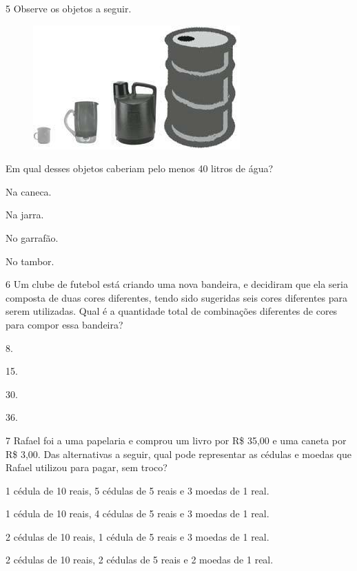 \num{5} Observe os objetos a seguir.

\begin{figure}[htpb!]
\centering
\includegraphics[width=\textwidth]{media/image87.jpg}
\end{figure}

Em qual desses objetos caberiam pelo menos 40 litros de água?

\begin{escolha}
\item
  Na caneca.
\item
  Na jarra.
\item
  No garrafão.
\item
  No tambor.
\end{escolha}


\num{6} Um clube de futebol está criando uma nova bandeira, e decidiram que ela seria composta de duas cores diferentes, tendo sido sugeridas seis cores
diferentes para serem utilizadas. Qual é a quantidade total de combinações
diferentes de cores para compor essa bandeira?

\begin{escolha}
\item
  8.
\item
  15.
\item
  30.
\item
  36.
\end{escolha}


\num{7} Rafael foi a uma papelaria e comprou um livro por R\$ 35,00 e uma caneta
por R\$ 3,00. Das alternativas a seguir, qual pode representar as cédulas
e moedas que Rafael utilizou para pagar, sem troco?

\begin{escolha}
\item
  1 cédula de 10 reais, 5 cédulas de 5 reais e 3 moedas de 1 real.
\item
  1 cédula de 10 reais, 4 cédulas de 5 reais e 3 moedas de 1 real.
\item
  2 cédulas de 10 reais, 1 cédula de 5 reais e 3 moedas de 1 real.
\item
  2 cédulas de 10 reais, 2 cédulas de 5 reais e 2 moedas de 1 real.
\end{escolha}


